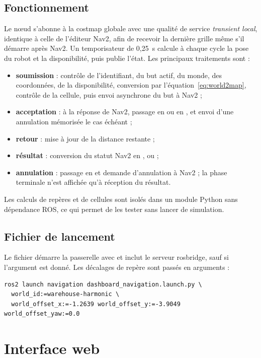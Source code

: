 \subsection{Fonctionnement}
Le nœud s'abonne à la costmap globale avec une qualité de service \emph{transient local},
identique à celle de l'éditeur Nav2, afin de recevoir la dernière grille même s'il démarre
après Nav2. Un temporisateur de 0,25~s calcule à chaque cycle la pose du robot et la
disponibilité, puis publie l'état. Les principaux traitements sont :
\begin{itemize}
  \item \textbf{soumission} : contrôle de l'identifiant, du but actif, du monde, des
    coordonnées, de la disponibilité, conversion par l'équation~\eqref{eq:world2map}, contrôle
    de la cellule, puis envoi asynchrone du but à Nav2 ;
  \item \textbf{acceptation} : à la réponse de Nav2, passage en  ou en
    , et envoi d'une annulation mémorisée le cas échéant ;
  \item \textbf{retour} : mise à jour de la distance restante ;
  \item \textbf{résultat} : conversion du statut Nav2 en ,
     ou  ;
  \item \textbf{annulation} : passage en  et demande d'annulation à Nav2 ;
    la phase terminale n'est affichée qu'à réception du résultat.
\end{itemize}
Les calculs de repères et de cellules sont isolés dans un module Python sans dépendance
ROS, ce qui permet de les tester sans lancer de simulation.

\subsection{Fichier de lancement}
Le fichier  démarre la passerelle avec
 et inclut le serveur rosbridge, sauf si l'argument
 est donné. Les décalages de repère sont passés en arguments :
\begin{lstlisting}
ros2 launch navigation dashboard_navigation.launch.py \
  world_id:=warehouse-harmonic \
  world_offset_x:=-1.2639 world_offset_y:=-3.9049 world_offset_yaw:=0.0
\end{lstlisting}

\section{Interface web}

